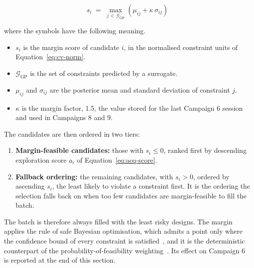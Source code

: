 \begin{itemize}
        \begin{equation}
        s_i \;=\; \max_{j \,\in\, \mathcal{G}_\mathrm{GP}}
        \left( \mu_{ij} + \kappa\,\sigma_{ij} \right)
        \label{eq:feas-margin}
        \end{equation}

        \noindent where the symbols have the following meaning.

        \begin{itemize}
          \item $s_i$ is the margin score of candidate $i$, in the
                normalised constraint units of
                Equation~\eqref{eq:cv-norm}.
          \item $\mathcal{G}_\mathrm{GP}$ is the set of constraints
                predicted by a surrogate.
          \item $\mu_{ij}$ and $\sigma_{ij}$ are the posterior mean and
                standard deviation of constraint $j$.
          \item $\kappa$ is the margin factor, 1.5, the value stored for
                the last Campaign 6 session and used in Campaigns 8 and 9.
        \end{itemize}

        The candidates are then ordered in two tiers:
        \begin{enumerate}
          \item \textbf{Margin-feasible candidates:} those with
                $s_i \le 0$, ranked first by descending exploration
                score $a_i$ of Equation~\eqref{eq:acq-score}.
          \item \textbf{Fallback ordering:} the remaining candidates,
                with $s_i > 0$, ordered by ascending $s_i$, the least
                likely to violate a constraint first. It is the ordering
                the selection falls back on when too few candidates are
                margin-feasible to fill the batch.
        \end{enumerate}
        The batch is therefore always filled with the least risky
        designs. The margin applies the rule of safe Bayesian
        optimisation, which admits a point only where the confidence
        bound of every constraint is satisfied~\cite{sui_safeopt_2015},
        and it is the deterministic counterpart of the
        probability-of-feasibility weighting~\cite{forrester_book_2008}.
        Its effect on Campaign 6 is reported at the end of this section.


\end{itemize}
